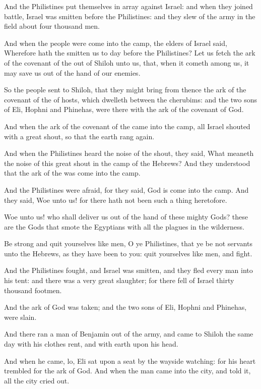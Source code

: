\verse And the Philistines put themselves in array against Israel: and when they joined battle, Israel was smitten before the Philistines: and they slew of the army in the field about four thousand men.

\verse And when the people were come into the camp, the elders of Israel said, Wherefore hath the \LORD smitten us to day before the Philistines? Let us fetch the ark of the covenant of the \LORD out of Shiloh unto us, that, when it cometh among us, it may save us out of the hand of our enemies.

\verse So the people sent to Shiloh, that they might bring from thence the ark of the covenant of the \LORD of hosts, which dwelleth between the cherubims: and the two sons of Eli, Hophni and Phinehas, were there with the ark of the covenant of God.

\verse And when the ark of the covenant of the \LORD came into the camp, all Israel shouted with a great shout, so that the earth rang again.

\verse And when the Philistines heard the noise of the shout, they said, What meaneth the noise of this great shout in the camp of the Hebrews?  And they understood that the ark of the \LORD was come into the camp.

\verse And the Philistines were afraid, for they said, God is come into the camp. And they said, Woe unto us! for there hath not been such a thing heretofore.

\verse Woe unto us! who shall deliver us out of the hand of these mighty Gods? these are the Gods that smote the Egyptians with all the plagues in the wilderness.

\verse Be strong and quit yourselves like men, O ye Philistines, that ye be not servants unto the Hebrews, as they have been to you: quit yourselves like men, and fight.

\verse And the Philistines fought, and Israel was smitten, and they fled every man into his tent: and there was a very great slaughter; for there fell of Israel thirty thousand footmen.

\verse And the ark of God was taken; and the two sons of Eli, Hophni and Phinehas, were slain.

\verse And there ran a man of Benjamin out of the army, and came to Shiloh the same day with his clothes rent, and with earth upon his head.

\verse And when he came, lo, Eli sat upon a seat by the wayside watching: for his heart trembled for the ark of God. And when the man came into the city, and told it, all the city cried out.

